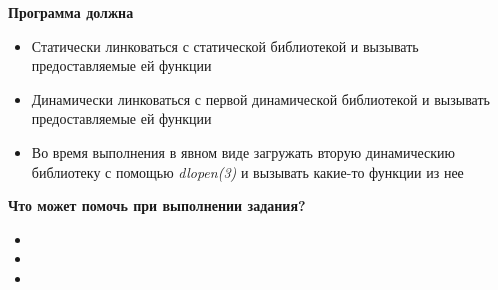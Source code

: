 \documentclass[../../lectures.tex]{subfiles}
\begin{document}
\textbf{Программа должна}
\begin{itemize}
    \item Статически линковаться с статической библиотекой и вызывать предоставляемые ей функции
    \item Динамически линковаться с первой динамической библиотекой и вызывать предоставляемые ей функции
    \item Во время выполнения в явном виде загружать вторую динамическию библиотеку с помощью \emph{dlopen(3)} и вызывать какие-то функции из нее
\end{itemize}

\textbf{Что может помочь при выполнении задания?}
\begin{itemize}
    \item {}
    \item {}
    \item {}
\end{itemize}
\end{document}
